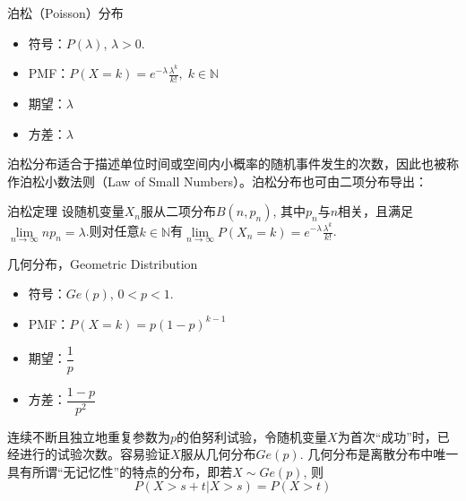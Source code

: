 \begin{frame}

\begin{block}{泊松（Poisson）分布}
\begin{itemize}
\item 符号：$P(\lambda)$, \; $\lambda > 0$.
\item PMF：$P(X = k) = e^{-\lambda}\frac{\lambda^k}{k!}, \; k \in \mathbb{N}$
\item 期望：$\lambda$
\item 方差：$\lambda$
\end{itemize}
\end{block}

\pause

泊松分布适合于描述单位时间或空间内小概率的随机事件发生的次数，因此也被称作泊松小数法则（Law of Small Numbers）。泊松分布也可由二项分布导出：

\begin{block}{泊松定理}
设随机变量$X_n$服从二项分布$B(n,p_n)$, 其中$p_n$与$n$相关，且满足$\lim\limits_{n\to\infty} np_n = \lambda$.则对任意$k \in \mathbb{N}$有$\lim\limits_{n\to\infty} P(X_n = k) = e^{-\lambda}\frac{\lambda^k}{k!}$.
\end{block}

\end{frame}


\begin{frame}

\begin{block}{几何分布，Geometric Distribution}
\begin{itemize}
\item 符号：$Ge(p)$, \; $0 < p < 1$.
\item PMF：$P(X = k) = p(1-p)^{k-1}$
\item 期望：$\dfrac{1}{p}$
\item 方差：$\dfrac{1-p}{p^2}$
\end{itemize}

\vspace{1em}
\pause

连续不断且独立地重复参数为$p$的伯努利试验，令随机变量$X$为首次``成功''时，已经进行的试验次数。容易验证$X$服从几何分布$Ge(p)$. 几何分布是离散分布中唯一具有所谓``无记忆性''的特点的分布，即若$X\sim Ge(p)$, 则
$$P(X>s+t | X>s) = P(X>t)$$
\end{block}

\end{frame}


